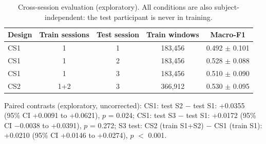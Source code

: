 \begin{table}[t]
\centering
\small
\caption{Cross-session evaluation (exploratory). All conditions are also subject-independent: the test participant is never in training.}
\label{tab:cross_session}
\begin{tabular}{lcccc}
\toprule
Design & Train sessions & Test session & Train windows & Macro-F1 \\
\midrule
CS1 & 1 & 1 & 183{,}456 & 0.492 $\pm$ 0.101 \\
CS1 & 1 & 2 & 183{,}456 & 0.528 $\pm$ 0.088 \\
CS1 & 1 & 3 & 183{,}456 & 0.510 $\pm$ 0.090 \\
CS2 & 1+2 & 3 & 366{,}912 & 0.530 $\pm$ 0.095 \\
\bottomrule
\end{tabular}
\par\smallskip\parbox{0.95\linewidth}{\footnotesize Paired contrasts (exploratory, uncorrected): CS1: test S2 $-$ test S1: +0.0355 (95\% CI +0.0091 to +0.0621), $p$ = 0.024; CS1: test S3 $-$ test S1: +0.0172 (95\% CI $-$0.0038 to +0.0391), $p$ = 0.272; S3 test: CS2 (train S1+S2) $-$ CS1 (train S1): +0.0210 (95\% CI +0.0146 to +0.0274), $p$ $<$ 0.001.}
\end{table}
